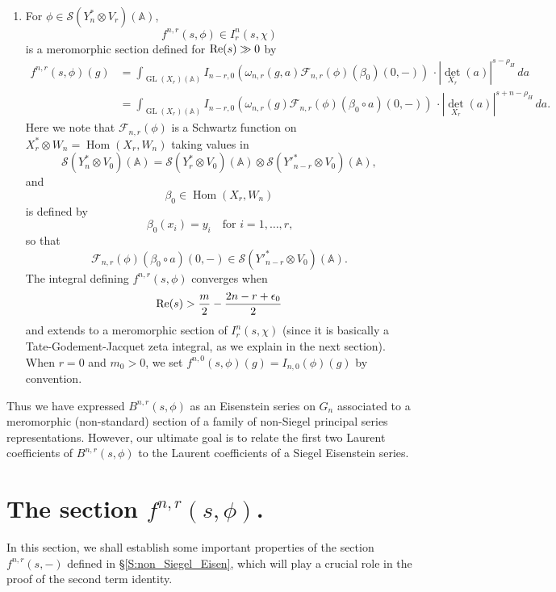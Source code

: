 \documentclass[10pt]{amsart}
\theoremstyle{plain}
\numberwithin{equation}{section}
\begin{document}
\begin{enumerate}[$\bullet$]
 \item For $\phi \in \mathcal{S}(Y_n^* \otimes V_r)({\mathbb{A}})$, 
 \[  f^{n,r}(s,\phi) \in I^n_r(s,\chi) \]
  is a meromorphic section defined for ${\rm Re}(s) \gg 0$ by
 \begin{align*}   f^{n,r}(s,\phi)(g)  &= 
 \int_{{\operatorname{GL}}(X_r)({\mathbb{A}})} I_{n-r,0}(\omega_{n,r}(g,a)\mathcal{F}_{n,r}(\phi)
 ( \beta_0)(0 , -) )\,\cdot   |{\det}_{X_r}(a)|^{s  - \rho_H} \, da \\
 &=  \int_{{\operatorname{GL}}(X_r)({\mathbb{A}})} I_{n-r,0}(\omega_{n,r}(g)\mathcal{F}_{n,r}(\phi)
 ( \beta_0 \circ a )(0 , -) )\,\cdot   |{\det}_{X_r}(a)|^{s  +n -
   \rho_H} \, da.
\end{align*}
 Here we note that  $\mathcal{F}_{n,r}(\phi)$ is a Schwartz function on
 $X_r^* \otimes W_n = {\operatorname{Hom}}(X_r, W_n)$ taking values in 
 \[  \mathcal{S}(Y_n^* \otimes V_0)({\mathbb{A}})  =  \mathcal{S}(Y_r^* \otimes V_0)({\mathbb{A}})
 \otimes \mathcal{S}({Y'}^*_{n-r}\otimes V_0)({\mathbb{A}}), \]
 and 
  \[  \beta_0 \in {\operatorname{Hom}}(X_r, W_{n}) \]
 is defined by
 \[  \beta_0(x_i)  = y_i  \quad \text{for $i = 1,\dots,r$,} \]
so that
 \[  \mathcal{F}_{n,r}(\phi)(\beta_0 \circ a)(0,-) \in \mathcal{S}({Y'}^*_{n-r} \otimes V_0)({\mathbb{A}}). \]
The integral defining $f^{n,r}(s,\phi)$ converges when 
\[  {\rm Re}(s) > \frac{m}{2} - \frac{2n-r + \epsilon_0}{2} \]
 and extends to  a meromorphic section of $I^n_r(s, \chi)$ (since it
 is basically a Tate-Godement-Jacquet zeta integral, as we explain in
 the next section).  When $r=0$ and $m_0>0$, we set $f^{n,0}(s,\phi)(g)=I_{n,0}(\phi)(g)$ by convention.
  \end{enumerate}
  \vskip 5pt
  
  Thus we have expressed $B^{n,r}(s, \phi)$ as an Eisenstein series on
  $G_n$ associated to a meromorphic (non-standard) section of a family
  of non-Siegel principal series representations. However, our
  ultimate goal is to relate the first two Laurent coefficients of
  $B^{n,r}(s, \phi)$ to the Laurent coefficients of a Siegel
  Eisenstein series.  
 \vskip 15pt
 
 \section{\bf The section $f^{n,r}(s,\phi)$.} \label{sectionf}
 In this section, we  shall establish some important properties of the
 section $f^{n,r}(s,-)$ defined in \S \ref{S:non_Siegel_Eisen}, which
 will play a crucial role in the proof of the second term identity.
 \vskip 5pt
 
\end{document}
